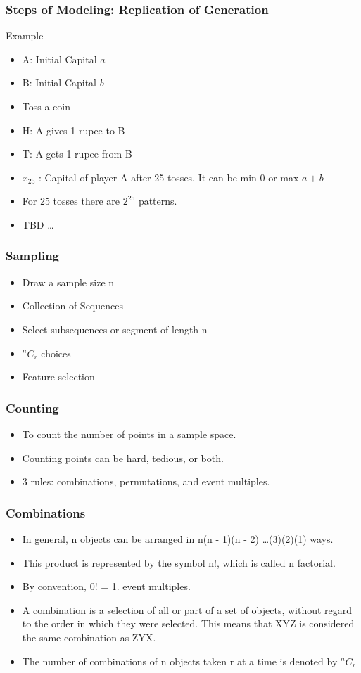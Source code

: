 \begin{frame}[fragile]\frametitle{Steps of Modeling: Replication of Generation}
Example
\begin{itemize}
\item A: Initial Capital $a$
\item B: Initial Capital $b$
\item Toss a coin
\item H: A gives 1 rupee to B
\item T: A gets 1 rupee from B
\item $x_{25}$ : Capital of player A after 25 tosses. It can be min $0$ or max $a+b$
\item For 25 tosses there are $2^{25}$ patterns.
\item TBD \ldots
\end{itemize}
\end{frame}

\begin{frame}[fragile]\frametitle{Sampling}
\begin{itemize}
\item Draw a sample size n
\item Collection of Sequences
\item Select subsequences or segment of length n
\item ${}^{n}C_{r}$ choices
\item Feature selection
\end{itemize}
\end{frame}

\begin{frame}[fragile]\frametitle{Counting}
\begin{itemize}
\item To count the number of points in a sample space. 
\item Counting points can be hard, tedious, or both.
\item 3 rules:  combinations, permutations, and
event multiples.
\end{itemize}
\end{frame}

\begin{frame}[fragile]\frametitle{Combinations}
\begin{itemize}
\item In general, n objects can be arranged in n(n - 1)(n - 2)  \ldots  (3)(2)(1) ways. 
\item This product is represented by the symbol n!, which is called n factorial. 
\item By convention, 0! = 1.
event multiples.
\item A combination is a selection of all or part of a set of objects, without regard to the order in which they were selected. This means that XYZ is considered the same combination
as ZYX.
\item The number of combinations of n objects taken r at a time is denoted by ${}^{n}C_{r}$
\end{itemize}
\end{frame}


